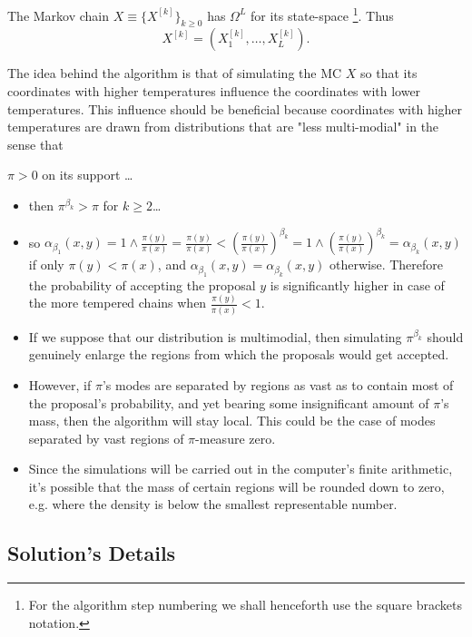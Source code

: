 The Markov chain $X \equiv \{ X^{[k]}\}_{k \geq 0}$ has $\Omega^L$ for its state-space \footnote{For the algorithm step numbering we shall henceforth use the square brackets notation.}. Thus $$X^{[k]} = (X_1^{[k]}, \dots, X_L^{[k]}).$$

The idea behind the algorithm is that of simulating the MC $X$ so that its coordinates with higher temperatures influence the coordinates with lower temperatures. This influence should be beneficial because coordinates with higher temperatures are drawn from distributions that are "less multi-modial" in the sense that

\begin{assumptions}[resume]
	\item $\pi > 0$ on its support \dots
\end{assumptions}
	

\begin{itemize}	
	\item then $\pi^{\beta_k} > \pi$ for $k \geq 2$\dots
	\item so $\alpha_{\beta_1}(x,y) = 1 \wedge \frac{\pi(y)}{\pi(x)} = \frac{\pi(y)}{\pi(x)} <  (\frac{\pi(y)}{\pi(x)})^{\beta_k} = 1 \wedge (\frac{\pi(y)}{\pi(x)})^{\beta_k} = \alpha_{\beta_k}(x,y)$ if only $\pi(y) < \pi(x)$, and $\alpha_{\beta_1}(x,y) = \alpha_{\beta_k}(x,y)$ otherwise. Therefore the probability of accepting the proposal $y$ is significantly higher in case of the more tempered chains when $\frac{\pi(y)}{\pi(x)} < 1$.
	\item If we suppose that our distribution is multimodial, then simulating $\pi^{\beta_k}$ should genuinely enlarge the regions from which the proposals would get accepted. 
	\item However, if $\pi$'s modes are separated by regions as vast as to contain most of the proposal's probability, and yet bearing some insignificant amount of $\pi$'s mass, then the algorithm will stay local. This could be the case of modes separated by vast regions of $\pi$-measure zero. 
	\item Since the simulations will be carried out in the computer's finite arithmetic, it's possible that the mass of certain regions will be rounded down to zero, e.g. where the density is below the smallest representable number.  
\end{itemize}  




	\subsection*{Solution's Details}

